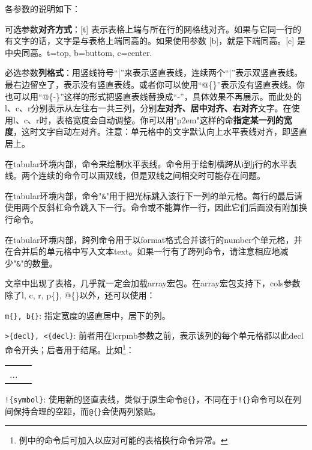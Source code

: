 {各参数的说明如下：
\begin{feai}
\item 可选参数\textbf{对齐方式}：[t] 表示表格上端与所在行的网格线对齐。如果与它同一行的有文字的话，文字是与表格上端同高的。如果使用参数 [b]，就是下端同高。[c] 是中央同高。t=top, b=buttom, c=center.
\item 必选参数\textbf{列格式}：用竖线符号“|”来表示竖直表线，连续两个“|”表示双竖直表线。最右边留空了，表示没有竖直表线。或者你可以使用“@\{\}”表示没有竖直表线。你也可以用“@\{-\}”这样的形式把竖直表线替换成“-”，具体效果不再展示。而此处的l、c、r分别表示从左往右一共三列，分别\textbf{左对齐、居中对齐、右对齐}文字。在使用l、c、r时，表格宽度会自动调整。你可以用"p{2em}"这样的命\textbf{指定某一列的宽度}，这时文字自动左对齐。注意：单元格中的文字默认向上水平表线对齐，即竖直居上。
\item 在tabular环境内部，命令\latexline{\\hline}来绘制水平表线。命令用于绘制横跨从i到j行的水平表线。两个连续的\latexline{\\hline}命令可以画双线，但是双线之间相交时可能存在问题。
\item 在tabular环境内部，命令"\texttt{\&}"用于把光标跳入该行下一列的单元格。每行的最后请使用两个反斜杠命令跳入下一行。命令\latexline{\\hline}或\latexline{\\cline}不能算作一行，因此它们后面没有附加换行命令。
\item 在tabular环境内部，跨列命令用于以format格式合并该行的number个单元格，并在合并后的单元格中写入文本text。如果一行有了跨列命令，请注意相应地减少"\texttt{\&}"的数量。
\end{feai}

文章中出现了表格，几乎就一定会加载array宏包。在array宏包支持下，cols参数除了l, c, r, p\{\}, @\{\}以外，还可以使用：
\begin{feai}
\item \texttt{m\{\}, b\{\}}: 指定宽度的竖直居中，居下的列。
\item \verb|>{decl}, <{decl}|: 前者用在lcrpmb参数之前，表示该列的每个单元格都以此decl命令开头；后者用于结尾。比如\footnote{例中的\latexline{\\centering}命令后可加入\latexline{\\arraybackslash}以应对可能的表格换行命令异常。}：
\begin{latex}{}
\begin{tabular}{|>{\centering\ttfamily}p{5em}
    |>{$}c<{$}|}
...
\end{tabular}
\end{latex}
\item \verb|!{symbol}|:  使用新的竖直表线，类似于原生命令\texttt{@\{\}}，不同在于\verb|!{}|命令可以在列间保持合理的空距，而\verb|@{}|会使两列紧贴。
\end{feai}

}
